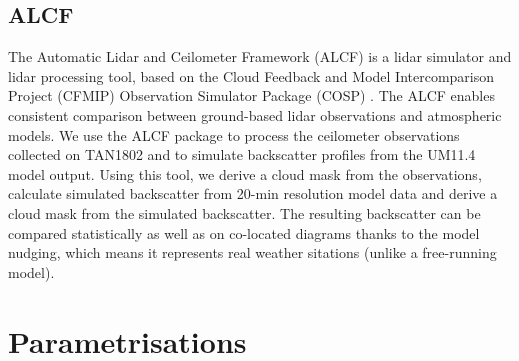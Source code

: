 \subsection{ALCF}
\label{sec:4:alcf}

The Automatic Lidar and Ceilometer Framework (ALCF) \citep{kuma2020b} is a lidar
simulator and lidar processing tool, based on the Cloud
Feedback and Model Intercomparison Project (CFMIP) Observation Simulator Package
(COSP) \citep{bodas-salcedo2011}. The ALCF enables consistent comparison
between ground-based lidar observations and atmospheric models.
We use the ALCF package to process the ceilometer
observations collected on TAN1802 and to simulate backscatter profiles from
the UM11.4 model output. Using this tool, we derive a cloud mask from
the observations, calculate simulated backscatter from 20-min resolution
model data and derive a cloud mask from the simulated backscatter.
The resulting backscatter can be compared statistically as well as on co-located
diagrams thanks to the model nudging, which means it represents real
weather sitations (unlike a free-running model).

\section{Parametrisations}
\label{sec:4:parametrisations}

\begin{table}
\caption[Summary of the cloud-related subgrid-scale parametrisations in the UM11.4]{
Summary of the cloud-related subgrid-scale parametrisations in the UM11.4.
}
\label{tab:4:parametrisations}
\centering
\centerline{}
\end{table}


